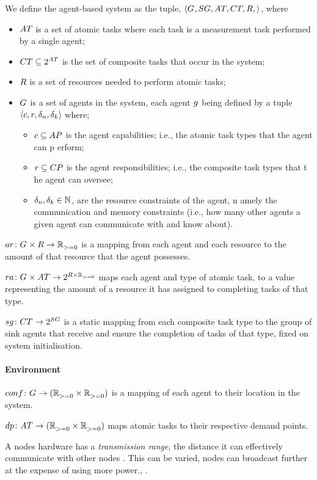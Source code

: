 We define the agent-based system as the tuple, $\langle 
	\setAgents{}{},
	\setSinkAgents{}{},
	\setAtomicTask{}{},
	\setCompositeTask{}{},
	\setResource{}{},
\rangle$, where
\begin{itemize}
	\item $\setAtomicTask{}{}$ is a set of atomic tasks where each task is a measurement task performed by a single agent;
	\item $\setCompositeTask{}{} \subseteq \powerSetSymbol{\setAtomicTask{}{}}{}{}$ is the set of composite tasks that occur in the system;
	\item $\setResource{}{}$ is a set of resources needed to perform atomic tasks;
	\item $G_{}^{}$ is a set of agents in the system, each agent $g_{}^{}$ being defined by a tuple $\langle c,r, \delta_n, \delta_k \rangle$ where;
	\begin{itemize}
		\item $\varAgentCapability{}{}\subseteq \setAtomicTaskType{}{}$ is the agent capabilities; i.e., the atomic task types that the agent can p    erform;
		 \item $\varAgentResponsiblity{}{} \subseteq \setCompositeTaskType{}{}$ is the agent responsibilities; i.e., the composite task types that t    he agent can oversee;
		\item $\delta_n, \delta_k \in \mathbb{N}$, are the resource constraints of the agent, n    amely the communication and memory constraints (i.e., how many other agents a given agent can communicate with and know about).
	\end{itemize}
\end{itemize}

$\formalAgentResources{}{}$ is a mapping from each agent and each resource to the amount of that resource that the agent possesses.

$\formalTaskResourceAllocation{}{}$ maps each agent and type of atomic task, to a value representing the amount of a resource it has assigned to completing tasks of that type.


$\formalSinkMapping{}{}$ is a static mapping from each composite task type to the group of sink agents that receive and ensure the completion of tasks of that type, fixed on system initialisation.


\paragraph{Environment}
$\formalDeployment{}{}$ is a mapping of each agent to their location in the system.

$\formalTaskDemandPoint{}{}$ maps atomic tasks to their respective demand points.

A nodes hardware has a \textit{transmission range}, the distance it can effectively communicate with other nodes \cite{Radman201}. This can be varied, nodes can broadcast further at the expense of using more power., \cite{Padmanabh2008, Song2009}.
